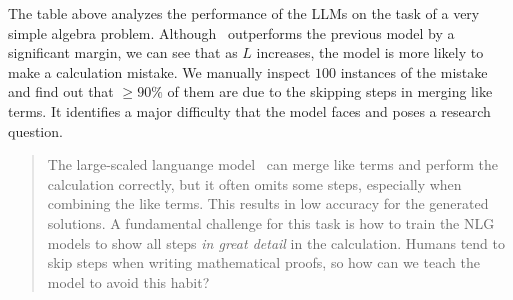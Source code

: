 The table above analyzes the performance of the LLMs on the task of a very simple algebra problem. Although \DV \ outperforms the previous model by a significant margin, we can see that as $L$ increases, the model is more likely to make a calculation mistake. We manually inspect $100$ instances of the mistake and find out that $\geq 90 \%$ of them are due to the skipping steps in merging like terms. It identifies a major difficulty that the model faces and poses a research question.
\begin{quote}
The large-scaled languange model \DV \ can merge like terms and perform the calculation correctly, but it often omits some steps, especially when combining the like terms. This results in low accuracy for the generated solutions. A fundamental challenge for this task is how to train the NLG models to show all steps \emph{in great detail} in the calculation. Humans tend to skip steps when writing mathematical proofs, so how can we teach the model to avoid this habit?
\end{quote}



